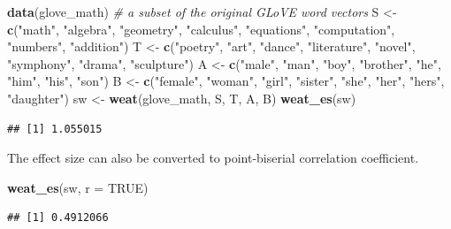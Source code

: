 \documentclass[english,man,mask]{apa6}
\newenvironment{Shaded}{\begin{snugshade}}{\end{snugshade}}
\newcommand{\CommentTok}[1]{\textcolor[rgb]{0.56,0.35,0.01}{\textit{#1}}}
\newcommand{\DataTypeTok}[1]{\textcolor[rgb]{0.13,0.29,0.53}{#1}}
\newcommand{\KeywordTok}[1]{\textcolor[rgb]{0.13,0.29,0.53}{\textbf{#1}}}
\newcommand{\NormalTok}[1]{#1}
\newcommand{\OtherTok}[1]{\textcolor[rgb]{0.56,0.35,0.01}{#1}}
\newcommand{\StringTok}[1]{\textcolor[rgb]{0.31,0.60,0.02}{#1}}
\begin{document}
\begin{Shaded}
\begin{Highlighting}[]
\KeywordTok{data}\NormalTok{(glove_math) }\CommentTok{# a subset of the original GLoVE word vectors}
\NormalTok{S <-}\StringTok{ }\KeywordTok{c}\NormalTok{(}\StringTok{"math"}\NormalTok{, }\StringTok{"algebra"}\NormalTok{, }\StringTok{"geometry"}\NormalTok{, }\StringTok{"calculus"}\NormalTok{, }\StringTok{"equations"}\NormalTok{, }\StringTok{"computation"}\NormalTok{,}
       \StringTok{"numbers"}\NormalTok{, }\StringTok{"addition"}\NormalTok{)}
\NormalTok{T <-}\StringTok{ }\KeywordTok{c}\NormalTok{(}\StringTok{"poetry"}\NormalTok{, }\StringTok{"art"}\NormalTok{, }\StringTok{"dance"}\NormalTok{, }\StringTok{"literature"}\NormalTok{, }\StringTok{"novel"}\NormalTok{, }\StringTok{"symphony"}\NormalTok{, }\StringTok{"drama"}\NormalTok{,}
       \StringTok{"sculpture"}\NormalTok{)}
\NormalTok{A <-}\StringTok{ }\KeywordTok{c}\NormalTok{(}\StringTok{"male"}\NormalTok{, }\StringTok{"man"}\NormalTok{, }\StringTok{"boy"}\NormalTok{, }\StringTok{"brother"}\NormalTok{, }\StringTok{"he"}\NormalTok{, }\StringTok{"him"}\NormalTok{, }\StringTok{"his"}\NormalTok{, }\StringTok{"son"}\NormalTok{)}
\NormalTok{B <-}\StringTok{ }\KeywordTok{c}\NormalTok{(}\StringTok{"female"}\NormalTok{, }\StringTok{"woman"}\NormalTok{, }\StringTok{"girl"}\NormalTok{, }\StringTok{"sister"}\NormalTok{, }\StringTok{"she"}\NormalTok{, }\StringTok{"her"}\NormalTok{, }\StringTok{"hers"}\NormalTok{, }\StringTok{"daughter"}\NormalTok{)}
\NormalTok{sw <-}\StringTok{ }\KeywordTok{weat}\NormalTok{(glove_math, S, T, A, B)}
\KeywordTok{weat_es}\NormalTok{(sw)}
\end{Highlighting}
\end{Shaded}

\begin{verbatim}
## [1] 1.055015
\end{verbatim}

The effect size can also be converted to point-biserial correlation coefficient.

\begin{Shaded}
\begin{Highlighting}[]
\KeywordTok{weat_es}\NormalTok{(sw, }\DataTypeTok{r =} \OtherTok{TRUE}\NormalTok{)}
\end{Highlighting}
\end{Shaded}

\begin{verbatim}
## [1] 0.4912066
\end{verbatim}
\end{document}

